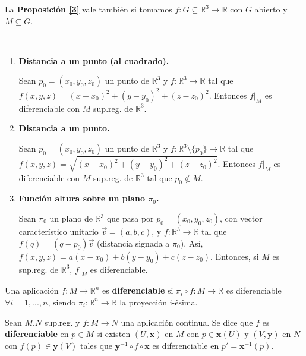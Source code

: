 \documentclass[twoside]{report}
\begin{document}
\begin{nota}
La \textbf{Proposición \ref{3}} vale también si tomamos $f: G \subseteq \mathbb{R}^3 \rightarrow \mathbb{R}$ con $G$ abierto y $M\subseteq G$.
\end{nota}

\newpage

\begin{ejs}\
\begin{enumerate}
\item \textbf{Distancia a un punto (al cuadrado).}


Sean $p_0=(x_0,y_0,z_0)$ un punto de $\mathbb{R}^3$ y $f: \mathbb{R}^3 \rightarrow \mathbb{R}$ tal que $f(x,y,z)=(x-x_0)^2+(y-y_0)^2+(z-z_0)
^2$. Entonces $f\vert_M$ es diferenciable con $M$ sup.reg. de $\mathbb{R}^3$.

\item \textbf{Distancia a un punto. }

Sean $p_0=(x_0,y_0,z_0)$ un punto de $\mathbb{R}^3$
y $f: \mathbb{R}^3 \setminus\lbrace p_0\rbrace \rightarrow \mathbb{R}$ tal que $f(x,y,z)=\sqrt{(x-x_0)^2+(y-y_0)^2+(z-z_0)
^2}$. Entonces  $f\vert_M$ es diferenciable con $M$ sup.reg. de $\mathbb{R}^3$ tal que $p_0 \notin M$.

\item \textbf{Función altura sobre un plano  $\pi_0$.}

Sean $\pi_0$ un plano de $\mathbb{R}^3$ que pasa por $p_0=(x_0,y_0,z_0)$, con vector característico unitario $\overrightarrow{v}=(a,b,c)$, y $f: \mathbb{R}^3 \rightarrow \mathbb{R}$ tal que $f(q)=(q-p_0)\overrightarrow{v}$ (distancia signada a $\pi_0$). Así, $f(x,y,z)=a(x-x_0)+b(y-y_0)+c(z-z_0)$. Entonces, si $M$ es sup.reg. de $\mathbb{R}^3$, $f\vert_M$ es diferenciable.
\end{enumerate}
\end{ejs}

\begin{defi}
Una aplicación $f: M \rightarrow \mathbb{R}^n$ es \textbf{diferenciable} si $\pi_i \circ f: M \rightarrow \mathbb{R}$ es diferenciable $\forall i =1,...,n$, siendo $\pi_i : \mathbb{R}^n \rightarrow \mathbb{R}$ la proyección i-ésima.
\end{defi}

\begin{defi}\label{7}
Sean $M$,$N$ sup.reg. y $f: M\rightarrow N$ una aplicación continua. Se dice que $f$ es \textbf{diferenciable} en $p\in M$  si existen $(U,\textbf{x})$ en $M$ con $p \in \textbf{x}(U)$ y $(V,\textbf{y})$ en $N$ con $f(p) \in \textbf{y}(V)$ tales que $\textbf{y}^{-1}\circ f \circ \textbf{x}$ es diferenciable en $p' = \textbf{x}^{-1}(p)$.
\end{defi}
\end{document}
